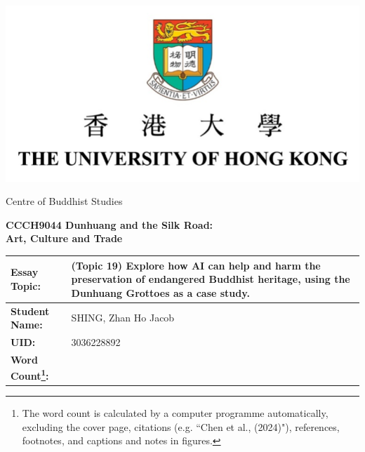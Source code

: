 \begin{center}
    \vspace*{1.5cm}

    \includegraphics{figs/misc/essay-cover-hku-logo.png}

    {\large Centre of Buddhist Studies}

    \vspace*{3cm}

    {\Large \textbf{CCCH9044 Dunhuang and the Silk Road: \\
    Art, Culture and Trade}}

    \vspace*{3cm}

    {
    \begin{tabularx}{\textwidth}{|l|X|}
        \hline
        \textbf{Essay Topic:} & (Topic 19) Explore how AI can help and harm the preservation of
        endangered Buddhist heritage,
        using the Dunhuang Grottoes as a case study. \\
        \hline
        \textbf{Student Name:} & SHING, Zhan Ho Jacob \\
        \hline
        \textbf{UID:} & 3036228892 \\
        \hline
        \textbf{Word Count\footnote{
            The word count is calculated by a computer programme automatically, excluding the cover page,
            citations (e.g. ``Chen et al., (2024)"), references, footnotes, and captions and notes in figures.
        }:} & \\
        \hline
    \end{tabularx}}
\end{center}